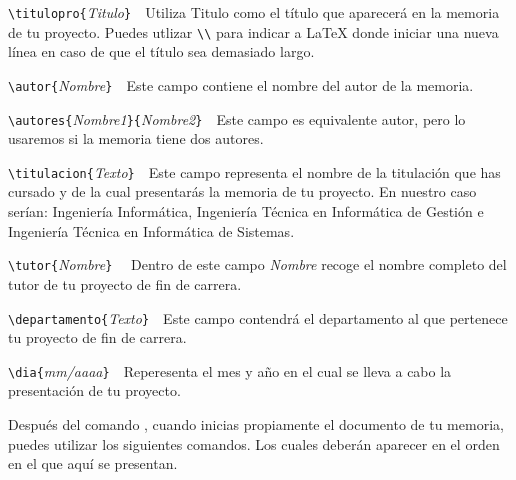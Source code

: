 \begin{description}

\item \verb|\titulopro{|\emph{Titulo}\verb|}|\ \ Utiliza Titulo como el t\'itulo que aparecer\'a en 
la memoria de tu proyecto. Puedes utlizar \verb|\\| para indicar a \LaTeX{} donde iniciar una nueva 
l\'inea en caso de que el t\'itulo sea demasiado largo.

\item \verb|\autor{|\emph{Nombre}\verb|}|\ \ Este campo contiene el nombre del autor 
de la memoria.

\item \verb|\autores{|\emph{Nombre1}\verb|}{|\emph{Nombre2}\verb|}|\ \ Este campo es equivalente autor, 
pero lo usaremos si la memoria tiene dos autores.

\item \verb|\titulacion{|\emph{Texto}\verb|}|\ \ Este campo representa el nombre de la titulaci\'on que 
has cursado y de la cual presentar\'as la memoria de tu proyecto. En nuestro caso ser\'ian: Ingenier\'ia 
Inform\'atica, Ingenier\'ia T\'ecnica en Inform\'atica de Gesti\'on e Ingenier\'ia T\'ecnica en 
Inform\'atica de Sistemas.

\item \verb|\tutor{|\emph{Nombre}\verb|}| \ \
  Dentro de este campo \emph{Nombre} recoge el nombre completo del tutor de tu proyecto de fin de carrera. 

\item \verb|\departamento{|\emph{Texto}\verb|}|\ \ Este campo contendr\'a el departamento al que pertenece 
tu proyecto de fin de carrera. 

\item \verb|\dia{|\emph{mm/aaaa}\verb|}|\ \ Reperesenta el mes y a\~no en el cual se lleva a cabo la 
presentaci\'on de tu proyecto.

\end{description}


Despu\'es  del comando \verb||, cuando inicias
propiamente el documento de tu memoria, puedes utilizar los siguientes comandos. Los
cuales deber\'an aparecer en el orden en el que aqu\'i se presentan.


